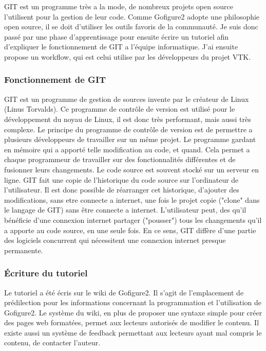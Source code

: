 GIT est un programme très a la mode, de nombreux projets open source l'utilisent pour la gestion de leur code. Comme Gofigure2 adopte une philosophie open source, il se doit d'utiliser les outils favoris de la communauté.
Je suis donc passé par une phase d'apprentissage pour ensuite écrire un tutoriel afin d'expliquer le fonctionnement de GIT a l'équipe informatique. J'ai ensuite propose un workflow, qui est celui utilise par les développeurs du projet VTK.

\subsubsection{Fonctionnement de GIT}

GIT est un programme de gestion de sources invente par le créateur de Linux  (Linus Torvalds). Ce programme de contrôle de version est utilisé pour le développement du noyau de Linux, il est donc très performant, mais aussi très complexe.
Le principe du programme de contrôle de version est de permettre a plusieurs développeurs de travailler sur un même projet. Le programme gardant en mémoire qui a apporté telle modification au code, et quand. Cela permet a chaque programmeur de travailler sur des fonctionnalités différentes et de fusionner leurs changements.
Le code source est souvent stocké sur un serveur en ligne. GIT fait une copie de l'historique du code source sur l'ordinateur de l'utilisateur. Il est donc possible de réarranger cet historique, d'ajouter des modifications, sans etre connecte a internet, une fois le projet copie ("clone" dans le langage de GIT) sans être connecte a internet. L'utilisateur peut, des qu'il bénéficie d'une connexion internet partager ("pousser") tous les changements qu'il a apporte au code source, en une seule fois. En ce sens, GIT diffère d'une partie des logiciels concurrent qui nécessitent une connexion internet presque permanente.


\subsubsection{Écriture du tutoriel}

Le tutoriel a été écris sur le wiki de Gofigure2. Il s'agit de l'emplacement de prédilection pour les informations concernant la programmation et l'utilisation de Gofigure2. Le système du wiki, en plus de proposer une syntaxe simple pour créer des pages web formatées, permet aux lecteurs autorisés de modifier le contenu. Il existe aussi un système de feedback permettant aux lecteurs ayant mal compris le contenu, de contacter l'auteur.

